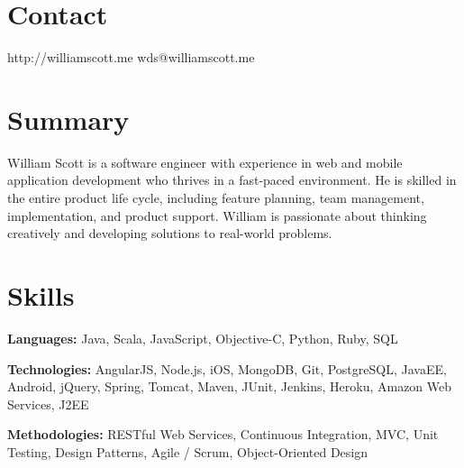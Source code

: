 \documentclass[margin,line]{resume}
\begin{document}
\begin{resume}
\vspace{-4mm}


  \section{\mysidestyle \textcolor{mySideColor}{Contact}}

  http://williamscott.me \hfill wds@williamscott.me




  \section{\mysidestyle \textcolor{mySideColor}{Summary}}

William Scott is a software engineer with experience in web and mobile
application development who thrives in a fast-paced environment. He is skilled
in the entire product life cycle, including feature planning, team management,
implementation, and product support. William is passionate about thinking
creatively and developing solutions to real-world problems.


  \section{\mysidestyle \textcolor{mySideColor}{Skills}}

  \textbf{Languages:} Java, Scala, JavaScript, Objective-C, Python, Ruby, SQL
	\vspace{-2mm}

  \textbf{Technologies:} AngularJS, Node.js, iOS, MongoDB, Git, PostgreSQL, JavaEE, Android, jQuery, Spring, Tomcat, Maven, JUnit, Jenkins, Heroku, Amazon Web Services, J2EE
	\vspace{-2mm}

  \textbf{Methodologies:} RESTful Web Services, Continuous Integration, MVC, Unit Testing, Design Patterns, Agile / Scrum, Object-Oriented Design
	\vspace{-2mm}


\end{resume}
\end{document}
